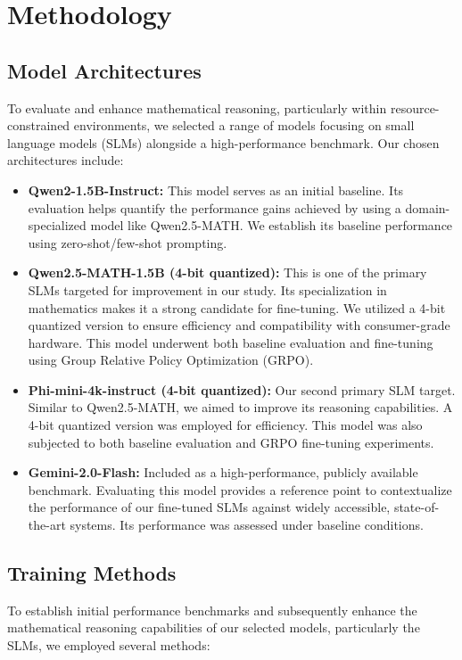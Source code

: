\documentclass[11pt]{article}
\begin{document}
\section{Methodology}
\subsection{Model Architectures}
To evaluate and enhance mathematical reasoning, particularly within resource-constrained environments, we selected a range of models focusing on small language models (SLMs) alongside a high-performance benchmark. Our chosen architectures include:

\begin{itemize}
    \item \textbf{Qwen2-1.5B-Instruct:} This model serves as an initial baseline. Its evaluation helps quantify the performance gains achieved by using a domain-specialized model like Qwen2.5-MATH. We establish its baseline performance using zero-shot/few-shot prompting.

    \item \textbf{Qwen2.5-MATH-1.5B (4-bit quantized):} This is one of the primary SLMs targeted for improvement in our study. Its specialization in mathematics makes it a strong candidate for fine-tuning. We utilized a 4-bit quantized version to ensure efficiency and compatibility with consumer-grade hardware. This model underwent both baseline evaluation and fine-tuning using Group Relative Policy Optimization (GRPO).

    \item \textbf{Phi-mini-4k-instruct (4-bit quantized):} %
    Our second primary SLM target. Similar to Qwen2.5-MATH, we aimed to improve its reasoning capabilities. A 4-bit quantized version was employed for efficiency. This model was also subjected to both baseline evaluation and GRPO fine-tuning experiments.

    \item \textbf{Gemini-2.0-Flash:} Included as a high-performance, publicly available benchmark. Evaluating this model provides a reference point to contextualize the performance of our fine-tuned SLMs against widely accessible, state-of-the-art systems. Its performance was assessed under baseline conditions.
\end{itemize}

\subsection{Training Methods}
To establish initial performance benchmarks and subsequently enhance the mathematical reasoning capabilities of our selected models, particularly the SLMs, we employed several methods:
\end{document}
